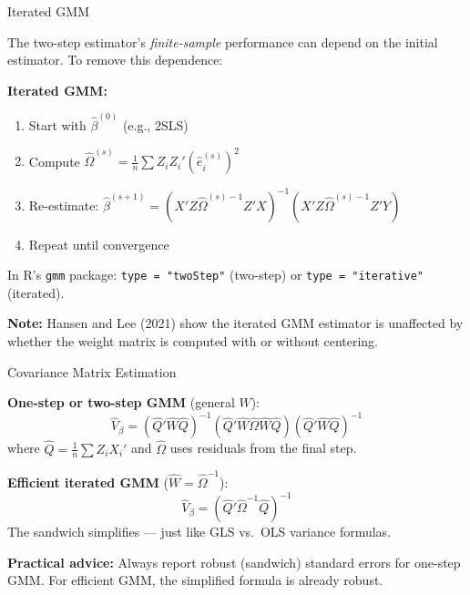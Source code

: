 \documentclass[aspectratio=169, handout, t]{beamer}
\numberwithin{equation}{section}
\begin{document}
\begin{frame}{Iterated GMM}

The two-step estimator's \textit{finite-sample} performance can depend on the initial estimator. To remove this dependence:

\medskip
\textbf{Iterated GMM:}
\begin{enumerate}
\item Start with $\hat\beta^{(0)}$ (e.g., 2SLS)
\item Compute $\hat\Omega^{(s)} = \frac{1}{n}\sum Z_iZ_i'(\hat e_i^{(s)})^2$
\item Re-estimate: $\hat\beta^{(s+1)} = (X'Z\hat\Omega^{(s)-1}Z'X)^{-1}(X'Z\hat\Omega^{(s)-1}Z'Y)$
\item Repeat until convergence
\end{enumerate}

\medskip
In R's \texttt{gmm} package: \texttt{type = "twoStep"} (two-step) or \texttt{type = "iterative"} (iterated).

\medskip
\textbf{Note:} Hansen and Lee (2021) show the iterated GMM estimator is unaffected by whether the weight matrix is computed with or without centering.

\end{frame}

\begin{frame}{Covariance Matrix Estimation}

\textbf{One-step or two-step GMM} (general $W$):
$$\hat V_\beta = (\hat Q'\hat W\hat Q)^{-1}(\hat Q'\hat W\hat\Omega\hat W\hat Q)(\hat Q'\hat W\hat Q)^{-1}$$
where $\hat Q = \frac{1}{n}\sum Z_iX_i'$ and $\hat\Omega$ uses residuals from the final step.

\medskip
\textbf{Efficient iterated GMM} ($\hat W = \hat\Omega^{-1}$):
$$\hat V_\beta = \left(\hat Q'\hat\Omega^{-1}\hat Q\right)^{-1}$$
The sandwich simplifies --- just like GLS vs.\ OLS variance formulas.

\medskip
\begin{tcolorbox}[colback=blue!5, colframe=blue!50]
\textbf{Practical advice:} Always report robust (sandwich) standard errors for one-step GMM. For efficient GMM, the simplified formula is already robust.
\end{tcolorbox}

\end{frame}

\end{document}
